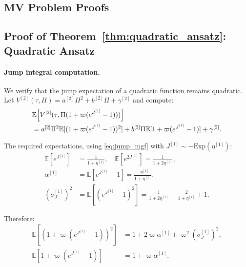 \documentclass[11pt,a4paper]{article}
\numberwithin{equation}{section}
\newcommand{\E}{\mathbb{E}}
\begin{document}
\begin{appendices}

\section{MV Problem Proofs}\label{app:mv_proofs}

\subsection{Proof of Theorem~\ref{thm:quadratic_ansatz}: Quadratic Ansatz}\label{app:quadratic}

\paragraph{Jump integral computation.}\label{app:jump_integral}

We verify that the jump expectation of a quadratic function remains quadratic. Let $V^{[2]}(\tau, \Pi) = a^{[2]}\Pi^2 + b^{[2]}\Pi + \gamma^{[2]}$ and compute:
\begin{align}
& \E\!\left[V^{[2]}(\tau, \Pi(1+\varpi(e^{J^{[1]}}-1)))\right] \notag \\
&= a^{[2]} \Pi^2 \E[(1+\varpi(e^{J^{[1]}}-1))^2] + b^{[2]} \Pi \E[1+\varpi(e^{J^{[1]}}-1)] + \gamma^{[2]}.
\label{eq:jump_quad_detail}
\end{align}

The required expectations, using \eqref{eq:jump_mgf} with $J^{[1]} \sim -\mathrm{Exp}(\eta^{[1]})$:
\begin{align}
\E[e^{J^{[1]}}] &= \frac{1}{1 + \eta^{[1]}}, \quad
\E[e^{2J^{[1]}}] = \frac{1}{1 + 2\eta^{[1]}}, \label{eq:jump_exp_moments} \\
\alpha^{[1]} &= \E[e^{J^{[1]}}-1] = \frac{-\eta^{[1]}}{1+\eta^{[1]}}, \label{eq:alpha1_detail} \\
(\sigma_J^{[1]})^2 &= \E[(e^{J^{[1]}}-1)^2] = \frac{1}{1+2\eta^{[1]}} - \frac{2}{1+\eta^{[1]}} + 1. \label{eq:sigJ1_detail}
\end{align}

Therefore:
\begin{align}
\E[(1+\varpi(e^{J^{[1]}}-1))^2] &= 1 + 2\varpi\alpha^{[1]} + \varpi^2 (\sigma_J^{[1]})^2, \label{eq:E_square} \\
\E[1+\varpi(e^{J^{[1]}}-1)] &= 1 + \varpi\alpha^{[1]}. \label{eq:E_linear}
\end{align}


\end{appendices}
\end{document}
